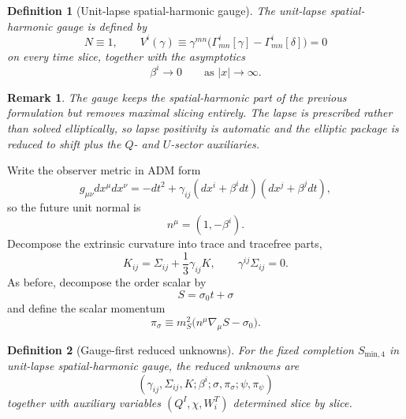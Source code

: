 \documentclass[11pt]{article}
\newtheorem{definition}{Definition}
\newtheorem{remark}{Remark}
\begin{document}
\begin{definition}[Unit-lapse spatial-harmonic gauge]
The \emph{unit-lapse spatial-harmonic gauge} is defined by
\begin{equation}
N\equiv 1,
\qquad
V^i(\gamma)\equiv \gamma^{mn}\bigl(\Gamma^i_{mn}[\gamma]-\Gamma^i_{mn}[\delta]\bigr)=0
\label{eq:gauge}
\end{equation}
on every time slice, together with the asymptotics
\begin{equation}
\beta^i\to 0
\qquad
\text{as } |x|\to\infty.
\label{eq:gaugeasym}
\end{equation}
\end{definition}

\begin{remark}
The gauge keeps the spatial-harmonic part of the previous formulation but removes maximal slicing entirely. The lapse is prescribed rather than solved elliptically, so lapse positivity is automatic and the elliptic package is reduced to shift plus the \(Q\)- and \(U\)-sector auxiliaries.
\end{remark}

Write the observer metric in ADM form
\begin{equation}
g_{\mu\nu}dx^\mu dx^\nu
=
-dt^2
+ \gamma_{ij}(dx^i+\beta^idt)(dx^j+\beta^jdt),
\label{eq:ADM}
\end{equation}
so the future unit normal is
\begin{equation}
n^\mu=(1,-\beta^i).
\label{eq:normal}
\end{equation}
Decompose the extrinsic curvature into trace and tracefree parts,
\begin{equation}
K_{ij}
=
\Sigma_{ij}+\frac{1}{3}\gamma_{ij}K,
\qquad
\gamma^{ij}\Sigma_{ij}=0.
\label{eq:Ksplit}
\end{equation}
As before, decompose the order scalar by
\begin{equation}
S=\sigma_0 t+\sigma
\label{eq:Sdecomp}
\end{equation}
and define the scalar momentum
\begin{equation}
\pi_\sigma
\equiv
m_S^2\bigl(n^\mu\nabla_\mu S-\sigma_0\bigr).
\label{eq:pisigma}
\end{equation}

\begin{definition}[Gauge-first reduced unknowns]
For the fixed completion \(S_{\mathrm{min},4}\) in unit-lapse spatial-harmonic gauge, the reduced unknowns are
\begin{equation}
(\gamma_{ij},\Sigma_{ij},K;\beta^i;\sigma,\pi_\sigma;\psi,\pi_\psi)
\label{eq:unknowns}
\end{equation}
together with auxiliary variables \((Q^I,\chi,W_i^T)\) determined slice by slice.
\end{definition}
\end{document}
